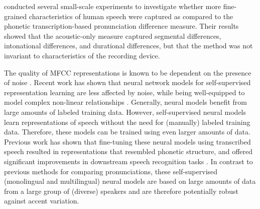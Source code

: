 \documentclass[11pt,a4paper]{article}
\begin{document}
\citet{acoustic-measure} conducted several small-scale experiments to investigate whether more fine-grained characteristics of human speech were captured as compared to the phonetic transcription-based pronunciation difference measure.
Their results showed that the acoustic-only measure captured segmental differences, intonational differences, and durational differences, but that the method was not invariant to characteristics of the recording device.

The quality of MFCC representations is known to be dependent on the presence of noise \citep{zhao2013}.
Recent work has shown that neural network models for self-supervised representation learning are less affected by noise, while being well-equipped to model complex non-linear relationships \citep{schneider2019wav2vec, baevski2019vq, ling2020deep, baevski2020wav2vec}.
Generally, neural models benefit from large amounts of labeled training data.
However, self-supervised neural models learn representations of speech without the need for (manually) labeled training data.
Therefore, these models can be trained using even larger amounts of data.
Previous work has shown that fine-tuning these neural models using transcribed speech resulted in representations that resembled phonetic structure, and offered significant improvements in downstream speech recognition tasks \citep{oord2018representation, kahn2020libri}.
In contrast to previous methods for comparing pronunciations, these self-supervised (monolingual and multilingual) neural models are based on large amounts of data from a large group of (diverse) speakers and are therefore potentially robust against accent variation.

\end{document}

